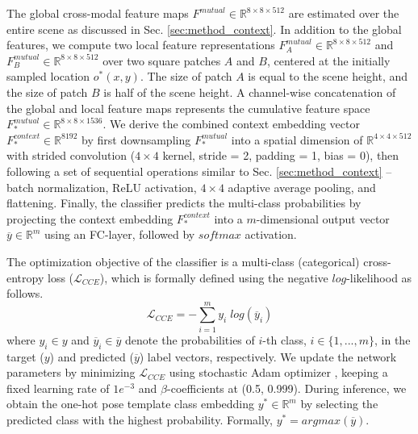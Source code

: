 The global cross-modal feature maps $F^{mutual} \in \mathbb{R}^{8 \times 8 \times 512}$ are estimated over the entire scene as discussed in Sec. \ref{sec:method_context}. In addition to the global features, we compute two local feature representations $F^{mutual}_A \in \mathbb{R}^{8 \times 8 \times 512}$ and $F^{mutual}_B \in \mathbb{R}^{8 \times 8 \times 512}$ over two square patches $A$ and $B$, centered at the initially sampled location $o^*(x, y)$. The size of patch $A$ is equal to the scene height, and the size of patch $B$ is half of the scene height. A channel-wise concatenation of the global and local feature maps represents the cumulative feature space $F^{mutual}_* \in \mathbb{R}^{8 \times 8 \times 1536}$. We derive the combined context embedding vector $F^{context}_* \in \mathbb{R}^{8192}$ by first downsampling $F^{mutual}_*$ into a spatial dimension of $\mathbb{R}^{4 \times 4 \times 512}$ with strided convolution ($4 \times 4$ kernel, stride = 2, padding = 1, bias = 0), then following a set of sequential operations similar to Sec. \ref{sec:method_context} -- batch normalization, ReLU activation, $4 \times 4$ adaptive average pooling, and flattening. Finally, the classifier predicts the multi-class probabilities by projecting the context embedding $F^{context}_*$ into a $m$-dimensional output vector $\overline{y} \in \mathbb{R}^m$ using an FC-layer, followed by $softmax$ activation.

The optimization objective of the classifier is a multi-class (categorical) cross-entropy loss ($\mathcal{L}_{CCE}$), which is formally defined using the negative $log$-likelihood as follows.
\[
\mathcal{L}_{CCE} = - \sum_{i=1}^m y_i \; log(\overline{y}_i)
\]
where $y_i \in y$ and $\overline{y}_i \in \overline{y}$ denote the probabilities of $i$-th class, $i \in \{1, ..., m\}$, in the target ($y$) and predicted ($\overline{y}$) label vectors, respectively. We update the network parameters by minimizing $\mathcal{L}_{CCE}$ using stochastic Adam optimizer \cite{kingma2015adam}, keeping a fixed learning rate of $1e^{-3}$ and $\beta$-coefficients at (0.5, 0.999). During inference, we obtain the one-hot pose template class embedding $y^* \in \mathbb{R}^m$ by selecting the predicted class with the highest probability. Formally, $y^* = argmax(\overline{y})$.

